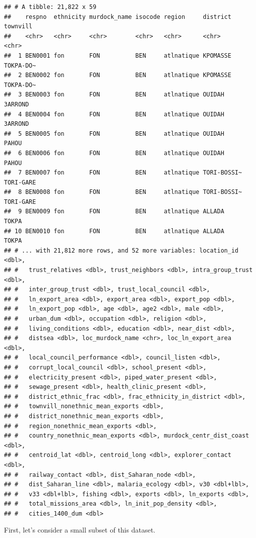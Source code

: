 \documentclass[]{book}
\theoremstyle{definition}
\theoremstyle{definition}
\theoremstyle{definition}
\theoremstyle{remark}
\begin{document}
\begin{verbatim}
## # A tibble: 21,822 x 59
##    respno  ethnicity murdock_name isocode region     district    townvill 
##    <chr>   <chr>     <chr>        <chr>   <chr>      <chr>       <chr>    
##  1 BEN0001 fon       FON          BEN     atlnatique KPOMASSE    TOKPA-DO~
##  2 BEN0002 fon       FON          BEN     atlnatique KPOMASSE    TOKPA-DO~
##  3 BEN0003 fon       FON          BEN     atlnatique OUIDAH      3ARROND  
##  4 BEN0004 fon       FON          BEN     atlnatique OUIDAH      3ARROND  
##  5 BEN0005 fon       FON          BEN     atlnatique OUIDAH      PAHOU    
##  6 BEN0006 fon       FON          BEN     atlnatique OUIDAH      PAHOU    
##  7 BEN0007 fon       FON          BEN     atlnatique TORI-BOSSI~ TORI-GARE
##  8 BEN0008 fon       FON          BEN     atlnatique TORI-BOSSI~ TORI-GARE
##  9 BEN0009 fon       FON          BEN     atlnatique ALLADA      TOKPA    
## 10 BEN0010 fon       FON          BEN     atlnatique ALLADA      TOKPA    
## # ... with 21,812 more rows, and 52 more variables: location_id <dbl>,
## #   trust_relatives <dbl>, trust_neighbors <dbl>, intra_group_trust <dbl>,
## #   inter_group_trust <dbl>, trust_local_council <dbl>,
## #   ln_export_area <dbl>, export_area <dbl>, export_pop <dbl>,
## #   ln_export_pop <dbl>, age <dbl>, age2 <dbl>, male <dbl>,
## #   urban_dum <dbl>, occupation <dbl>, religion <dbl>,
## #   living_conditions <dbl>, education <dbl>, near_dist <dbl>,
## #   distsea <dbl>, loc_murdock_name <chr>, loc_ln_export_area <dbl>,
## #   local_council_performance <dbl>, council_listen <dbl>,
## #   corrupt_local_council <dbl>, school_present <dbl>,
## #   electricity_present <dbl>, piped_water_present <dbl>,
## #   sewage_present <dbl>, health_clinic_present <dbl>,
## #   district_ethnic_frac <dbl>, frac_ethnicity_in_district <dbl>,
## #   townvill_nonethnic_mean_exports <dbl>,
## #   district_nonethnic_mean_exports <dbl>,
## #   region_nonethnic_mean_exports <dbl>,
## #   country_nonethnic_mean_exports <dbl>, murdock_centr_dist_coast <dbl>,
## #   centroid_lat <dbl>, centroid_long <dbl>, explorer_contact <dbl>,
## #   railway_contact <dbl>, dist_Saharan_node <dbl>,
## #   dist_Saharan_line <dbl>, malaria_ecology <dbl>, v30 <dbl+lbl>,
## #   v33 <dbl+lbl>, fishing <dbl>, exports <dbl>, ln_exports <dbl>,
## #   total_missions_area <dbl>, ln_init_pop_density <dbl>,
## #   cities_1400_dum <dbl>
\end{verbatim}

First, let's consider a small subset of this dataset.
\end{document}
